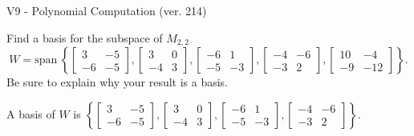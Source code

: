 \begin{exercise}
  \begin{exerciseTitle}V9 - Polynomial Computation (ver. 214)\end{exerciseTitle}
  \begin{exerciseStatement}
    Find a basis for the subspace of \(M_{2,2}\) 
\[W=\mathrm{span}\ \left\{\left[\begin{array}{cc}
3 & -5 \\
-6 & -5
\end{array}\right] , \left[\begin{array}{cc}
3 & 0 \\
-4 & 3
\end{array}\right] , \left[\begin{array}{cc}
-6 & 1 \\
-5 & -3
\end{array}\right] , \left[\begin{array}{cc}
-4 & -6 \\
-3 & 2
\end{array}\right] , \left[\begin{array}{cc}
10 & -4 \\
-9 & -12
\end{array}\right]\right\}.\]
 Be sure to explain why your result is a basis.


  \end{exerciseStatement}
  \begin{exerciseAnswer}
   A basis of \(W\) is  \(\left\{\left[\begin{array}{cc}
3 & -5 \\
-6 & -5
\end{array}\right] , \left[\begin{array}{cc}
3 & 0 \\
-4 & 3
\end{array}\right] , \left[\begin{array}{cc}
-6 & 1 \\
-5 & -3
\end{array}\right] , \left[\begin{array}{cc}
-4 & -6 \\
-3 & 2
\end{array}\right]\right\}\).
  


  \end{exerciseAnswer}
\end{exercise}